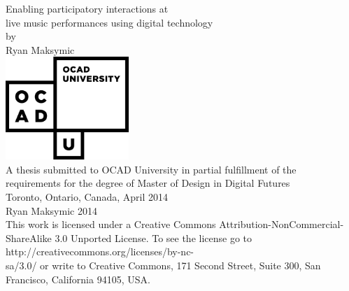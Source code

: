 \begin{titlepage}
\begin{center}

\LARGE{Enabling participatory interactions at\\live music performances using digital technology}\\[0.5cm]
\large{by\\[0.5cm]
Ryan Maksymic}\\[1.5cm]
\includegraphics[width=0.35\textwidth]{ocadu_logo.png}\\[1cm]
\small
A thesis submitted to OCAD University in partial fulfillment of the\\
requirements for the degree of Master of Design in Digital Futures\\[1cm]
Toronto, Ontario, Canada, April 2014\\[1cm]
\ccLogo \hspace{0.05cm} Ryan Maksymic 2014\\
This work is licensed under a Creative Commons Attribution-NonCommercial-ShareAlike 3.0 Unported License. To see the license go to http://creativecommons.org/licenses/by-nc-\\sa/3.0/ or write to Creative Commons, 171 Second Street, Suite 300, San Francisco, California 94105, USA.

\end{center}
\end{titlepage}